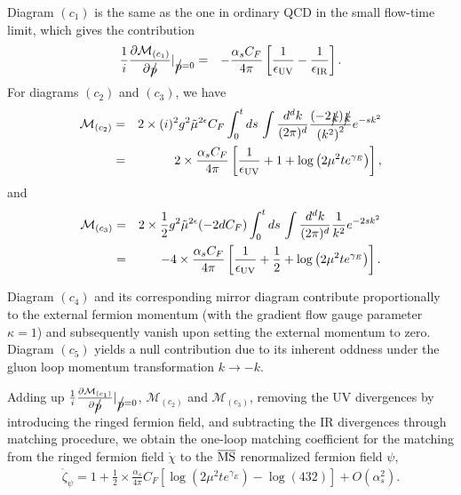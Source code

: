 Diagram $(c_1)$ is the same as the one in ordinary QCD in the small flow-time limit, which gives the contribution 
\begin{eqnarray}
\label{eq:c1}
\frac{1}{i}\frac{\partial\mathcal{M}_{(c_1)}}{\partial \slashed{p}}|_{\slashed{p}=0}&=& -\frac{\alpha_sC_F}{4\pi}\left[\frac{1}{\epsilon_{\rm UV}}-\frac{1}{\epsilon_{\rm IR}}\right].
\end{eqnarray}
For diagrams $(c_2)$ and  $(c_3)$, we have 
\begin{eqnarray}
\label{eq:c2}
\mathcal{M}_{(c_2)}&=& 2\times (i)^2g^2\tilde{\mu}^{2\epsilon}C_F\int_0^tds\, \int\frac{d^dk}{(2\pi)^d}\frac{(-2\slashed{k})\slashed{k}}{\left(k^2 \right)^2}e^{-sk^2}\nonumber\\
&=&2\times\frac{\alpha_sC_F}{4\pi}\left[\frac{1}{\epsilon_{\rm UV}}+1+\log\left(2\mu^2 te^{\gamma_E}\right)\right],
\end{eqnarray}
and
\begin{eqnarray}
\label{eq:c3}
\mathcal{M}_{(c_3)}&=&2\times \frac{1}{2}g^2\tilde{\mu}^{2\epsilon}(-2dC_F)\int_0^tds\, \int\frac{d^dk}{(2\pi)^d}\frac{1}{k^2}e^{-2sk^2}\nonumber\\
&=&-4\times\frac{\alpha_sC_F}{4\pi}\left[\frac{1}{\epsilon_{\rm UV}}+\frac{1}{2}+\log\left(2\mu^2 te^{\gamma_E}\right)\right].
\end{eqnarray}

Diagram $(c_4)$ and its corresponding mirror diagram contribute proportionally to the external fermion momentum (with the gradient flow gauge parameter $\kappa=1$) and subsequently vanish upon setting the external momentum to zero. Diagram $(c_5)$ yields a null contribution due to its inherent oddness under the gluon loop momentum transformation $k\rightarrow -k$.

Adding up $\frac{1}{i}\frac{\partial\mathcal{M}_{(c_1)}}{\partial \slashed{p}}|_{\slashed{p}=0}$, $\mathcal{M}_{(c_2)}$ and $\mathcal{M}_{(c_3)}$, removing the UV divergences by introducing the ringed fermion field,  and subtracting the IR divergences through matching procedure, we obtain the one-loop matching coefficient for the matching from the ringed fermion field $\mathring{\chi}$ to the $\overline{\rm MS}$ renormalized fermion field $\psi$,
\begin{eqnarray}
\label{eq:quarkselfresult}
\mathring{\zeta}_{\psi}= 1 +  \frac{1}{2} \times\frac{\alpha_s}{4\pi}C_F\left[\log\left(2\mu^2 te^{\gamma_E}\right)-\log(432)\right] + O(\alpha_s^2).
\end{eqnarray}
